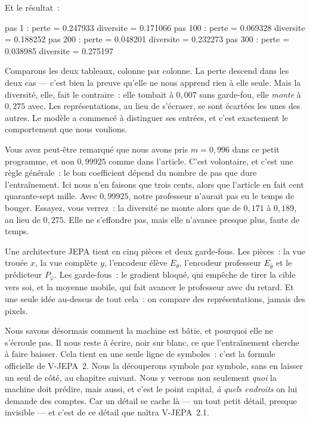 Et le résultat~:

\begin{sortie}
pas    1 : perte = 0.247933   diversite = 0.171066
pas  100 : perte = 0.069328   diversite = 0.188252
pas  200 : perte = 0.048201   diversite = 0.232273
pas  300 : perte = 0.038985   diversite = 0.275197
\end{sortie}

Comparons les deux tableaux, colonne par colonne. La perte descend dans les
deux cas — c'est bien la preuve qu'elle ne nous apprend rien à elle seule.
Mais la diversité, elle, fait le contraire~: elle tombait à $0{,}007$ sans
garde-fou, elle \emph{monte} à $0{,}275$ avec. Les représentations, au lieu
de s'écraser, se sont écartées les unes des autres. Le modèle a commencé à
distinguer ses entrées, et c'est exactement le comportement que nous
voulions.

\begin{plusloin}
Vous avez peut-être remarqué que nous avons pris $m = 0{,}996$ dans ce petit
programme, et non $0{,}99925$ comme dans l'article. C'est volontaire, et
c'est une règle générale~: le bon coefficient dépend du nombre de pas que
dure l'entraînement. Ici nous n'en faisons que trois cents, alors que
l'article en fait cent quarante-sept mille. Avec $0{,}99925$, notre
professeur n'aurait pas eu le temps de bouger. Essayez, vous verrez~: la
diversité ne monte alors que de $0{,}171$ à $0{,}189$, au lieu de $0{,}275$.
Elle ne s'effondre pas, mais elle n'avance presque plus, faute de temps.
\end{plusloin}

\begin{aretenir}
Une architecture JEPA tient en cinq pièces et deux garde-fous. Les pièces~:
la vue trouée $x$, la vue complète $y$, l'encodeur élève $E_{\theta}$,
l'encodeur professeur $E_{\bar{\theta}}$ et le prédicteur $P_{\varphi}$. Les
garde-fous~: le gradient bloqué, qui empêche de tirer la cible vers soi, et
la moyenne mobile, qui fait avancer le professeur avec du retard. Et une
seule idée au-dessus de tout cela~: on compare des représentations, jamais
des pixels.
\end{aretenir}

\vspace{0.5em}

Nous savons désormais comment la machine est bâtie, et pourquoi elle ne
s'écroule pas. Il nous reste à écrire, noir sur blanc, ce que
l'entraînement cherche à faire baisser. Cela tient en une seule ligne de
symboles~: c'est la formule officielle de V-JEPA~2. Nous la découperons
symbole par symbole, sans en laisser un seul de côté, au chapitre suivant. Nous y verrons non seulement
\emph{quoi} la machine doit prédire, mais aussi, et c'est le point capital,
\emph{à quels endroits} on lui demande des comptes. Car un détail se cache
là — un tout petit détail, presque invisible — et c'est de ce détail que
naîtra V-JEPA~2.1.

